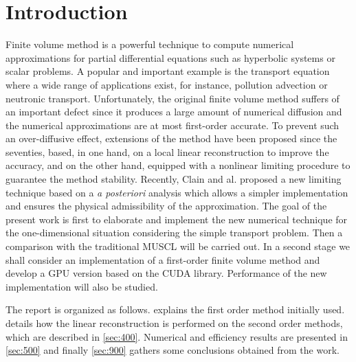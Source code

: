 \section{Introduction}
\label{sec:100}
Finite volume method is a powerful technique to compute numerical approximations for partial differential equations
such as hyperbolic systems or scalar problems. A popular and important example is the transport equation 
where a wide range of applications exist, for instance, pollution advection or neutronic transport.
Unfortunately, the original finite volume method suffers of an important defect since it produces a large amount 
of numerical diffusion and the numerical approximations are at most first-order accurate. 
To prevent such an over-diffusive effect, extensions of the method have been proposed since the seventies, 
based, in one hand, on a local linear reconstruction to improve the accuracy, and on the other hand,
equipped with a nonlinear limiting procedure to guarantee the method stability. Recently, Clain and al. \cite{CLD}
proposed a new limiting technique based on a {\it a posteriori} analysis which allows a simpler implementation and 
ensures the physical admissibility of the approximation.
The goal of the present work is first to elaborate and implement the new numerical technique for the one-dimensional
situation  considering the simple transport problem. Then a comparison with the traditional MUSCL will be carried
out. In a second stage we shall consider an implementation of a first-order finite volume method and develop
a GPU version based on the CUDA library. Performance of the new implementation will also be studied.


The report is organized as follows.  explains the first order method initially used. 
 details how the linear reconstruction is performed on the second order methods, 
which are described in \cref{sec:400}. Numerical and efficiency results are presented in \cref{sec:500} 
and finally \cref{sec:900} gathers some conclusions obtained from the work.

